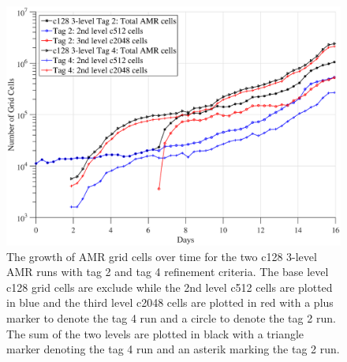 \begin{figure}
   \centerline{%
   \noindent
   \includegraphics[width=\textwidth]{Chap2/c128_3l4_Tag2vs4_compare.eps}}
   \caption{The growth of AMR grid cells over time for the two c128 3-level AMR runs 
   with tag 2 and tag 4 refinement criteria. The base level c128 grid cells are exclude
   while the 2nd level c512 cells are plotted in blue and the third level c2048 cells are
   plotted in red with a plus marker to denote the tag 4 run and a circle to denote the
   tag 2 run.  The sum of the two levels are plotted in black with a triangle marker denoting
   the tag 4 run and an asterik marking the tag 2 run. 
   }
   \label{fig.grid_num_c128}
\end{figure}

